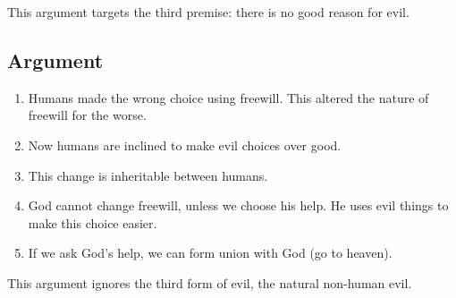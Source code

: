\documentclass{article}
\begin{document}
This argument targets the third premise: there is no good reason for evil.

\subsection{Argument}

\begin{enumerate}
  \item Humans made the wrong choice using freewill. This altered the nature of
    freewill for the worse.
  \item Now humans are inclined to make evil choices over good.
  \item This change is inheritable between humans.
  \item God cannot change freewill, unless we choose his help. He uses evil
    things to make this choice easier.
  \item If we ask God's help, we can form union with God (go to heaven).
\end{enumerate}

This argument ignores the third form of evil, the natural non-human evil.
\end{document}
